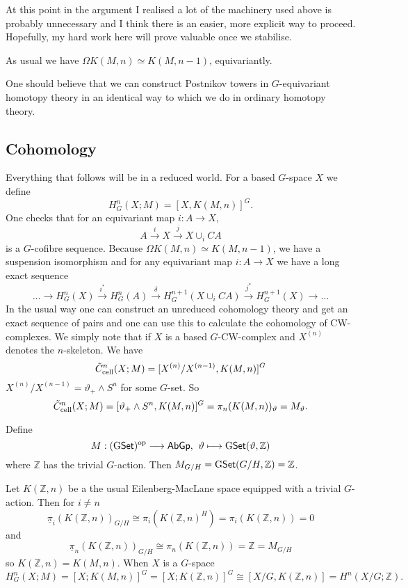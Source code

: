 \documentclass[11pt]{article}
\begin{document}
At this point in the argument I realised a lot of the machinery used above is probably unnecessary and I think there is an easier, more explicit way to proceed. Hopefully, my hard work here will prove valuable once we stabilise.

As usual we have $\Omega K(M,n)\simeq K(M,n-1)$, equivariantly.

One should believe that we can construct Postnikov towers in $G$-equivariant homotopy theory in an identical way to which we do in ordinary homotopy theory.







\subsection*{Cohomology}
Everything that follows will be in a reduced world. For a based $G$-space $X$ we define
\[H^n_G(X;M)=[X,K(M,n)]^G.\]
One checks that for an equivariant map $i:A\to X$,
\[A\overset{i}{\to}X\overset{j}{\to}X\cup_i CA\]
is a $G$-cofibre sequence. Because $\Omega K(M,n)\simeq K(M,n-1)$, we have a suspension isomorphism and for any equivariant map $i:A\to X$ we have a long exact sequence
\[\ldots\to H^n_G(X)\overset{i^*}{\to}H^n_G(A)\overset{\delta}{\to}
H^{n+1}_G(X\cup_i CA)\overset{j^*}{\to} H^{n+1}_G(X)\to\ldots\]
In the usual way one can construct an unreduced cohomology theory and get an exact sequence of pairs and one can use this to calculate the cohomology of CW-complexes. We simply note that if $X$ is a based $G$-CW-complex and $X^{(n)}$ denotes the $n$-skeleton. We have
\[\tilde{C}^n_{\textup{cell}}(X;M)=[X^{(n)}/X^{(n-1)},K(M,n)]^G\]
$X^{(n)}/X^{(n-1)}=\vartheta_+\wedge S^n$ for some $G$-set. So
\[\tilde{C}^n_{\textup{cell}}(X;M)=[\vartheta_+\wedge S^n,K(M,n)]^G=\pi_n(K(M,n))_{\vartheta}=M_{\vartheta}.\]
\begin{exmp*}
Define
\[M:(\operatorname{{G\mathsf{Set}}})^{\textup{op}}\longrightarrow\operatorname{{\mathsf{AbGp}}},
\hspace{4pt}
\vartheta\longmapsto \operatorname{{G\mathsf{Set}}}(\vartheta,\mathbb{Z})\]
where $\mathbb{Z}$ has the trivial $G$-action. Then $M_{G/H}=
\operatorname{{G\mathsf{Set}}}(G/H,\mathbb{Z})=\mathbb{Z}$.

Let $K(\mathbb{Z},n)$ be a the usual Eilenberg-MacLane space equipped with a trivial $G$-action. Then for $i\neq n$
\[\underline{\pi}_i(K(\mathbb{Z},n))_{G/H}\cong
\pi_i(K(\mathbb{Z},n)^H)=\pi_i(K(\mathbb{Z},n))=0\]
and
\[\underline{\pi}_n(K(\mathbb{Z},n))_{G/H}\cong
\pi_n(K(\mathbb{Z},n))=\mathbb{Z}=M_{G/H}\]
so $K(\mathbb{Z},n)=K(M,n)$. When $X$ is a $G$-space
\[H^n_G(X;M)=[X;K(M,n)]^G=[X;K(\mathbb{Z},n)]^G
\cong[X/G,K(\mathbb{Z},n)]=H^n(X/G;\mathbb{Z}).\]
\end{exmp*}
\end{document}

